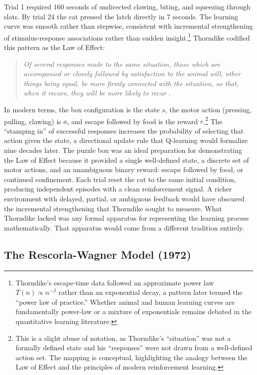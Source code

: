 Trial 1 required 160 seconds of undirected clawing, biting, and squeezing through slats. By trial 24 the cat pressed the latch directly in 7 seconds. The learning curve was smooth rather than stepwise, consistent with incremental strengthening of stimulus-response associations rather than sudden insight.\footnote{Thorndike's escape-time data followed an approximate power law $T(n) \propto n^{-\beta}$ rather than an exponential decay, a pattern later termed the ``power law of practice.'' Whether animal and human learning curves are fundamentally power-law or a mixture of exponentials remains debated in the quantitative learning literature.} Thorndike codified this pattern as the Law of Effect:

\begin{quote}\itshape
Of several responses made to the same situation, those which are accompanied or closely followed by satisfaction to the animal will, other things being equal, be more firmly connected with the situation, so that, when it recurs, they will be more likely to recur \citep{Thorndike1898}.
\end{quote}

In modern terms, the box configuration is the state $s$, the motor action (pressing, pulling, clawing) is $a$, and escape followed by food is the reward $r$.\footnote{This is a slight abuse of notation, as Thorndike's ``situation'' was not a formally defined state and his ``responses'' were not drawn from a well-defined action set. The mapping is conceptual, highlighting the analogy between the Law of Effect and the principles of modern reinforcement learning.} The ``stamping in'' of successful responses increases the probability of selecting that action given the state, a directional update rule that Q-learning would formalize nine decades later. The puzzle box was an ideal preparation for demonstrating the Law of Effect because it provided a single well-defined state, a discrete set of motor actions, and an unambiguous binary reward: escape followed by food, or continued confinement. Each trial reset the cat to the same initial condition, producing independent episodes with a clean reinforcement signal. A richer environment with delayed, partial, or ambiguous feedback would have obscured the incremental strengthening that Thorndike sought to measure. What Thorndike lacked was any formal apparatus for representing the learning process mathematically. That apparatus would come from a different tradition entirely.

\subsection{The Rescorla-Wagner Model (1972)}

